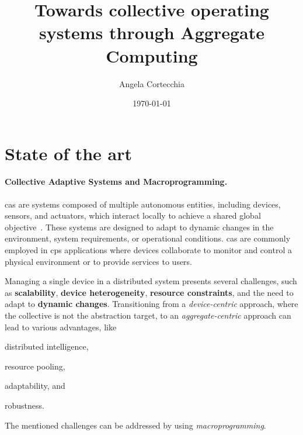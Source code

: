 \documentclass[12pt, a4paper]{article}
\newenvironment{inlinelist}{\begin{enumerate*}[label=\emph{(\roman*)}]}{\end{enumerate*}}
\begin{document}
\title{Towards collective operating systems through Aggregate Computing}
\author{Angela Cortecchia}
\date{\today}
\maketitle
%

\section{State of the art}
\label{sec:state-of-the-art}
\sloppypar
\paragraph{Collective Adaptive Systems and Macroprogramming.}
\ac{cas} are systems composed of multiple autonomous entities,
including devices, sensors, and actuators, which interact locally to achieve a shared global objective~\cite{ferscha2015}.
%
These systems are designed to adapt to dynamic changes in the environment, system requirements, or operational conditions.
%
\ac{cas} are commonly employed in \ac{cps} applications where devices collaborate to monitor and control a
physical environment or to provide services to users.

Managing a single device in a distributed system presents several challenges,
such as \textbf{scalability}, \textbf{device heterogeneity},
\textbf{resource constraints}, and the need to adapt to \textbf{dynamic changes}.
%
Transitioning from a \emph{device-centric} approach,
where the collective is not the abstraction target,
to an \emph{aggregate-centric} approach can lead to various advantages, like
\begin{inlinelist}
    \item distributed intelligence,
    \item resource pooling,
    \item adaptability, and
    \item robustness.
\end{inlinelist}
%
The mentioned challenges can be addressed by using \emph{macroprogramming}.
\end{document}
